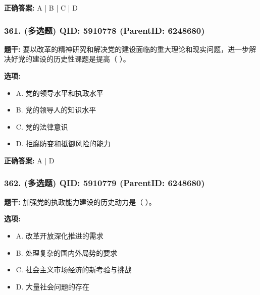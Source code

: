 \documentclass[12pt,UTF8]{ctexart}
\begin{document}
\textbf{正确答案:}
A | B | C | D

\vspace{0.3em}\hrulefill\vspace{0.7em}

\subsubsection*{361. (多选题) \small QID: 5910778 (ParentID: 6248680)}

\textbf{题干:}
要以改革的精神研究和解决党的建设面临的重大理论和现实问题，进一步解决好党的建设的历史性课题是提高（ ）。



\textbf{选项:}
\begin{itemize}[leftmargin=*]

  \item A. 党的领导水平和执政水平

  \item B. 党的领导人的知识水平

  \item C. 党的法律意识

  \item D. 拒腐防变和抵御风险的能力

\end{itemize}

\textbf{正确答案:}
A | D

\vspace{0.3em}\hrulefill\vspace{0.7em}

\subsubsection*{362. (多选题) \small QID: 5910779 (ParentID: 6248680)}

\textbf{题干:}
加强党的执政能力建设的历史动力是（ ）。



\textbf{选项:}
\begin{itemize}[leftmargin=*]

  \item A. 改革开放深化推进的需求

  \item B. 处理复杂的国内外局势的要求

  \item C. 社会主义市场经济的新考验与挑战

  \item D. 大量社会问题的存在

\end{itemize}
\end{document}
